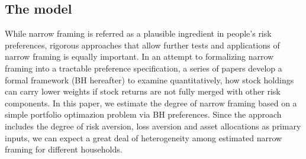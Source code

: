 \documentclass[ukenglish,nottitlepage,thmsb,11pt,letterpaper]{article}
\begin{document}
\subsection{The model}
While narrow framing is referred as a plausible ingredient in people's risk preferences, rigorous approaches that allow further tests and applications of narrow framing is equally important. In an attempt to formalizing narrow framing into a tractable preference specification, a series of papers \citep[e.g.,][]{Barberis2001,Barberis2006,Barberis2009} develop a formal framework (BH hereafter) to examine quantitatively, how stock holdings can carry lower weights if stock returns are not fully merged with other risk components. In this paper, we estimate the degree of narrow framing based on a simple portfolio optimazion problem via BH preferences. Since the approach includes the degree of risk aversion, loss aversion and asset allocations as primary inputs, we can expect a great deal of heterogeneity among estimated narrow framing for different households.
\end{document}
